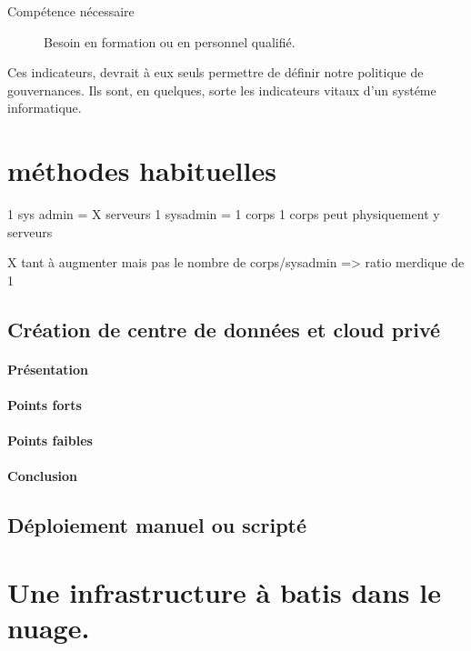 \documentclass[11pt, a4paper ]{article}
\let\stdsection\section
\renewcommand\section{\newpage\stdsection}
\begin{document}
\begin{spacing}{1.5}
\begin{description}
	\item[Compétence nécessaire]
		Besoin en formation ou en personnel qualifié.

\end{description}

Ces indicateurs, devrait à eux seuls permettre de définir notre politique de gouvernances. Ils sont, en quelques, sorte les indicateurs vitaux d'un systéme informatique.

		\section{méthodes habituelles} %

1 sys admin = X serveurs
1 sysadmin = 1 corps
1 corps peut physiquement y serveurs

X tant à augmenter mais pas le nombre de corps/sysadmin => ratio merdique de 1


			\subsection{Création de centre de données et cloud privé}
\paragraph{Présentation}

\paragraph{Points forts}

\paragraph{Points faibles}

\paragraph{Conclusion}

			\subsection{Déploiement manuel ou scripté}

		\section{Une infrastructure à batis dans le nuage.}	 %


\end{spacing}
\end{document}
